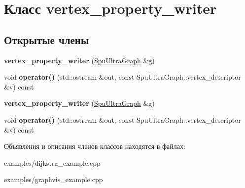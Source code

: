 \hypertarget{classvertex__property__writer}{}\section{Класс vertex\+\_\+property\+\_\+writer}
\label{classvertex__property__writer}
\subsection*{Открытые члены}
\begin{DoxyCompactItemize}
\item 
\mbox{\label{classvertex__property__writer_ab69d3dcb19e388676458dc1e972b8a44}} 
{\bfseries vertex\+\_\+property\+\_\+writer} (\hyperlink{class_s_p_u___g_r_a_p_h_1_1_spu_ultra_graph}{Spu\+Ultra\+Graph} \&g)
\item 
\mbox{\label{classvertex__property__writer_a42b7a6dc52b543dd3ac07f031b0cf793}} 
void {\bfseries operator()} (std\+::ostream \&out, const Spu\+Ultra\+Graph\+::vertex\+\_\+descriptor \&v) const
\item 
\mbox{\label{classvertex__property__writer_ab69d3dcb19e388676458dc1e972b8a44}} 
{\bfseries vertex\+\_\+property\+\_\+writer} (\hyperlink{class_s_p_u___g_r_a_p_h_1_1_spu_ultra_graph}{Spu\+Ultra\+Graph} \&g)
\item 
\mbox{\label{classvertex__property__writer_a42b7a6dc52b543dd3ac07f031b0cf793}} 
void {\bfseries operator()} (std\+::ostream \&out, const Spu\+Ultra\+Graph\+::vertex\+\_\+descriptor \&v) const
\end{DoxyCompactItemize}


Объявления и описания членов классов находятся в файлах\+:\begin{DoxyCompactItemize}
\item 
examples/dijkstra\+\_\+example.\+cpp\item 
examples/graphvis\+\_\+example.\+cpp\end{DoxyCompactItemize}
